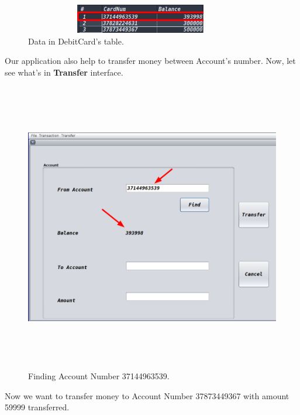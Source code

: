 \documentclass[12pt,a4paper]{article}
\begin{document}
\begin{figure}[H]
        \centering
        \includegraphics[width=4in,height=0.5in]{Picture/updateDb.png}
        \caption{Data in DebitCard's table.}
    \end{figure}
\newpage
    \indent Our application also help to transfer money between Account's number. Now, let see what's in \textbf{Transfer} interface.

\begin{figure}[H]
        \centering
        \includegraphics[width=5.5in,height=5in]{Picture/findAccNum1.png}
        \caption{Finding Account Number 37144963539.}
    \end{figure}
\newpage
\indent Now we want to transfer money to Account Number 37873449367 with amount 59999 transferred.
\end{document}
